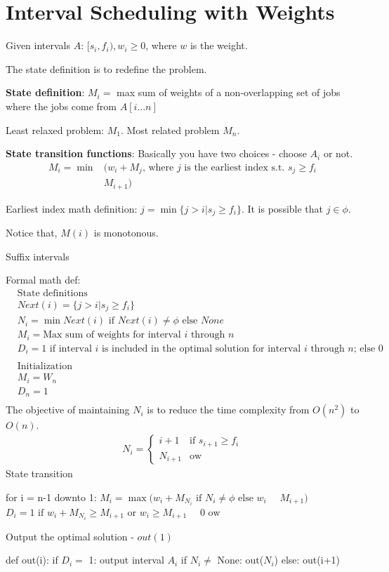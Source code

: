 \documentclass[a4paper]{report}
\theoremstyle{definition}
\begin{document}
\section{Interval Scheduling with Weights}\label{sec:mindp}
Given intervals $A$: $[s_i, f_i), w_i\geq 0$, where $w$ is the weight.

The state definition is to redefine the problem.

\textbf{State definition}:
$M_i=$ max sum of weights of a non-overlapping set of jobs where the jobs come from $A[i...n]$

Least relaxed problem: $M_1$. Most related problem $M_n$.

\textbf{State transition functions}: Basically you have two choices -  choose $A_i$ or not.
\begin{align*}
M_i = \min&\Big( w_i+M_j \text{, where $j$ is the earliest index s.t. } s_j\geq f_i\\
&M_{i+1}\Big)
\end{align*}

Earliest index math definition: $j=\min\{j>i|s_j\geq f_i\}$. It is possible that $j\in \phi$.


Notice that, $M(i)$ is monotonous.

Suffix intervals

Formal math def:
\begin{align*}
& \text{State definitions} \\
& Next(i) = \{j>i|s_j\geq f_i\}\\
& N_i = \min Next(i) \text{ if } Next(i)\neq \phi \text{ else } None\\
& M_i = \text{Max sum of weights for interval $i$ through $n$} \\
& D_i = 1 \text{ if interval $i$ is included in the optimal solution for interval $i$ through $n$; else } 0\\
\\
&\text{Initialization}\\
& M_{i}=W_n \\
& D_n=1 \\
\end{align*}
The objective of maintaining $N_i$ is to reduce the time complexity from $O(n^2)$ to $O(n)$. 
\begin{eqnarray*}
N_i = \left\{ \begin{array}{rl}
  i+1 &\mbox{if $s_{i+1} \geq f_i$} \\
  N_{i+1} &\mbox{ow}
       \end{array} \right.
\end{eqnarray*}
State transition
\begin{python}[mathescape]
for i = n-1 downto 1:
  $M_i = \max\Big(w_i+M_{N_i} \text{ if }N_i\neq \phi \text{ else } w_i $
             $\quad M_{i+1} \Big)$
  $D_i = 1 \text{ if }w_i+M_{N_i}\geq M_{i+1} \text{ or } w_i \geq M_{i+1}$
      $\quad 0 \text{ ow}$
\end{python}
Output the optimal solution - $out(1)$
\begin{python}[mathescape]
def out(i):
  if $D_i=$ 1:
    output interval $A_i$
    if $N_i\neq$  None:
      out($N_i$)
  else:
    out(i+1)
\end{python}
\end{document}
